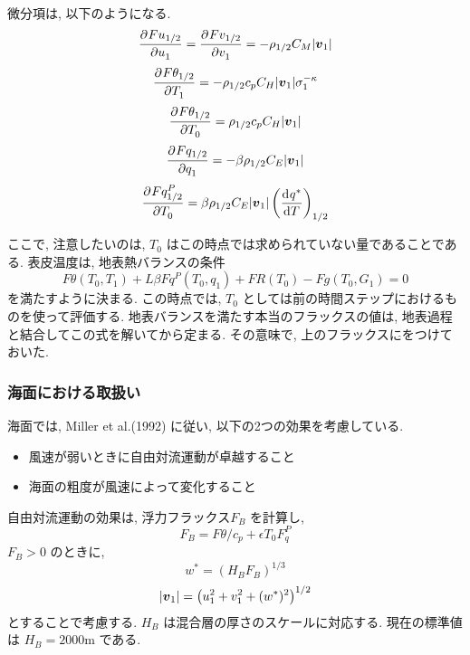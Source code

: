 微分項は, 以下のようになる.
\begin{equation}
\DP{Fu_{1/2}}{u_1} = \DP{Fv_{1/2}}{v_1} 
= - \rho_{1/2} C_M |\Dvect{v}_1|
\end{equation}
\begin{equation}
\DP{F\theta_{1/2}}{T_1} 
= - \rho_{1/2} c_p C_H |\Dvect{v}_1| \sigma_1^{-\kappa}
\end{equation}
\begin{equation}
\DP{F\theta_{1/2}}{T_0} 
= \rho_{1/2} c_p C_H |\Dvect{v}_1|
\end{equation}
\begin{equation}
\DP{Fq_{1/2}}{q_1} 
 =  - \beta \rho_{1/2} C_E |\Dvect{v}_1| 
\end{equation}
\begin{equation}
\DP{Fq^P_{1/2}}{T_0} 
 =  \beta \rho_{1/2} C_E |\Dvect{v}_1| \left( \DD{q^*}{T} \right)_{1/2}
\end{equation}

ここで, 注意したいのは,
$T_0$ はこの時点では求められていない量であることである.
表皮温度は, 
地表熱バランスの条件
\begin{equation}
   F\theta(T_0,T_1) + L \beta Fq^P(T_0,q_1) + FR(T_0) - Fg(T_0,G_1) = 0
\end{equation}
を満たすように決まる.
この時点では, $T_0$ としては前の時間ステップにおけるものを使って評価する.
地表バランスを満たす本当のフラックスの値は,
地表過程と結合してこの式を解いてから定まる.
その意味で, 上のフラックスに$\hat{\mbox{}}$をつけておいた.

\subsubsection{海面における取扱い}

海面では, Miller et al.(1992) に従い, 以下の2つの効果を考慮している.
\begin{itemize}
\item 風速が弱いときに自由対流運動が卓越すること
\item 海面の粗度が風速によって変化すること
\end{itemize}

自由対流運動の効果は, 浮力フラックス$F_B$ を計算し,
\begin{equation}
  F_B = F\theta/c_p + \epsilon T_0 F_q^P
\end{equation}
$F_B >0$ のときに,
\begin{equation}
  w^* = ( H_{B} F_B )^{1/3}
\end{equation}
\begin{equation}
  |\Dvect{v}_1| = \left( u_1^2 + v_1^2 + (w^*)^2 \right)^{1/2}
\end{equation}
とすることで考慮する.  $H_B$ は混合層の厚さのスケールに対応する.
現在の標準値は $H_B=2000$m である.

